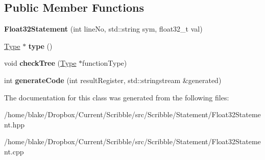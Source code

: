 \subsection*{Public Member Functions}
\begin{DoxyCompactItemize}
\item 
\hypertarget{class_scribble_core_1_1_float32_statement_ab66923b22e1fb3efdac02f4f50f253ce}{{\bfseries Float32\-Statement} (int line\-No, std\-::string sym, float32\-\_\-t val)}\label{class_scribble_core_1_1_float32_statement_ab66923b22e1fb3efdac02f4f50f253ce}

\item 
\hypertarget{class_scribble_core_1_1_float32_statement_ac9a00240c3eec2c34ffdbf2d4a91e564}{\hyperlink{class_scribble_core_1_1_type}{Type} $\ast$ {\bfseries type} ()}\label{class_scribble_core_1_1_float32_statement_ac9a00240c3eec2c34ffdbf2d4a91e564}

\item 
\hypertarget{class_scribble_core_1_1_float32_statement_afafd2fd9fdc1c02258a62e1063f2d0ff}{void {\bfseries check\-Tree} (\hyperlink{class_scribble_core_1_1_type}{Type} $\ast$function\-Type)}\label{class_scribble_core_1_1_float32_statement_afafd2fd9fdc1c02258a62e1063f2d0ff}

\item 
\hypertarget{class_scribble_core_1_1_float32_statement_ab920c6d8f9928af7f23b03158a4126a3}{int {\bfseries generate\-Code} (int result\-Register, std\-::stringstream \&generated)}\label{class_scribble_core_1_1_float32_statement_ab920c6d8f9928af7f23b03158a4126a3}

\end{DoxyCompactItemize}


The documentation for this class was generated from the following files\-:\begin{DoxyCompactItemize}
\item 
/home/blake/\-Dropbox/\-Current/\-Scribble/src/\-Scribble/\-Statement/Float32\-Statement.\-hpp\item 
/home/blake/\-Dropbox/\-Current/\-Scribble/src/\-Scribble/\-Statement/Float32\-Statement.\-cpp\end{DoxyCompactItemize}

